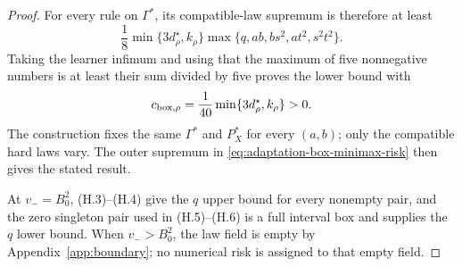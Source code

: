 \begin{proof}
For every rule on $\Gamma^*$, its compatible-law supremum is therefore
at least
\[
 \frac18\min\{3d_\rho^\star,k_\rho\}
       \max\{q,ab,bs^2,at^2,s^2t^2\}.
\]
Taking the learner infimum and using that the maximum of five
nonnegative numbers is at least their sum divided by five proves the
lower bound with
\[
 c_{{\rm box},\rho}
 =\frac1{40}\min\{3d_\rho^\star,k_\rho\}>0.
\]
The construction fixes the same $\Gamma^*$ and $P_X^*$ for every
$(a,b)$; only the compatible hard laws vary. The outer supremum in
\eqref{eq:adaptation-box-minimax-risk} then gives the stated result.

At $v_-=B_0^2$, (H.3)--(H.4) give the $q$ upper bound for every
nonempty pair, and the zero singleton pair used in (H.5)--(H.6) is a
full interval box and supplies the $q$ lower bound. When $v_->B_0^2$,
the law field is empty by Appendix~\ref{app:boundary}; no numerical
risk is assigned to that empty field.
\end{proof}
